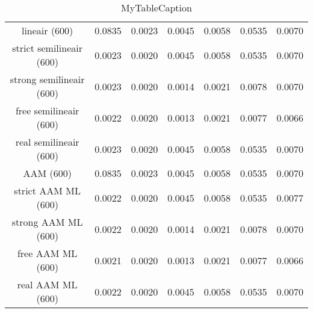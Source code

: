 \begin{table}
\centering
\begin{tabular}{|c|c|c|c|c|c|c|}
\hline
 &  &  &  &  &  &  \\
\hline
lineair (600) & 0.0835 & 0.0023 & 0.0045 & 0.0058 & 0.0535 & 0.0070 \\
\hline
strict semilineair (600) & 0.0023 & 0.0020 & 0.0045 & 0.0058 & 0.0535 & 0.0070 \\
\hline
strong semilineair (600) & 0.0023 & 0.0020 & 0.0014 & 0.0021 & 0.0078 & 0.0070 \\
\hline
free semilineair (600) & 0.0022 & 0.0020 & 0.0013 & 0.0021 & 0.0077 & 0.0066 \\
\hline
real semilineair (600) & 0.0023 & 0.0020 & 0.0045 & 0.0058 & 0.0535 & 0.0070 \\
\hline
AAM (600) & 0.0835 & 0.0023 & 0.0045 & 0.0058 & 0.0535 & 0.0070 \\
\hline
strict AAM ML (600) & 0.0022 & 0.0020 & 0.0045 & 0.0058 & 0.0535 & 0.0077 \\
\hline
strong AAM ML (600) & 0.0022 & 0.0020 & 0.0014 & 0.0021 & 0.0078 & 0.0070 \\
\hline
free AAM ML (600) & 0.0021 & 0.0020 & 0.0013 & 0.0021 & 0.0077 & 0.0066 \\
\hline
real AAM ML (600) & 0.0022 & 0.0020 & 0.0045 & 0.0058 & 0.0535 & 0.0070 \\
\hline
\end{tabular}
\caption{MyTableCaption}
\label{table:MyTableLabel}
\end{table}
